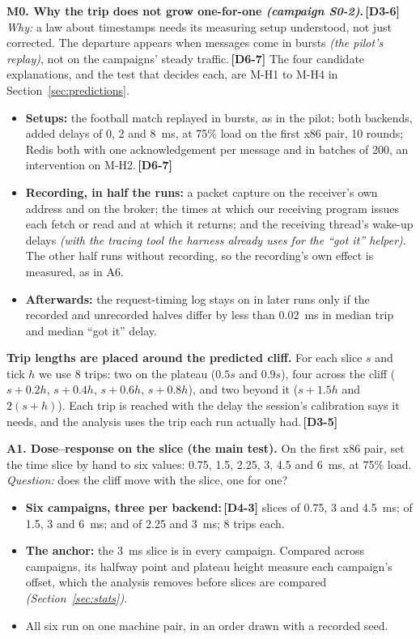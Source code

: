 \documentclass[11pt]{article}
\newcommand{\gl}[1]{{\color{soft}\itshape\small (#1)}}
\newcommand{\chg}[1]{\,{\color{chgcol}\bfseries\footnotesize[#1]}}
\newcommand{\chgold}[1]{\,{\color{oldcol}\bfseries\footnotesize[#1]}}
\begin{document}
\textbf{M0. Why the trip does not grow one-for-one \gl{campaign S0-2}.}\chgold{D3-6} \emph{Why:} a law about timestamps needs its measuring setup understood, not just corrected. The departure appears when messages come in bursts \gl{the pilot's replay}, not on the campaigns' steady traffic.\chg{D6-7} The four candidate explanations, and the test that decides each, are M-H1 to M-H4 in Section~\ref{sec:predictions}.
\begin{itemize}
  \item \textbf{Setups:} the football match replayed in bursts, as in the pilot; both backends, added delays of 0, 2 and 8~ms, at 75\% load on the first x86 pair, 10 rounds; Redis both with one acknowledgement per message and in batches of 200, an intervention on M-H2.\chg{D6-7}
  \item \textbf{Recording, in half the runs:} a packet capture on the receiver's own address and on the broker; the times at which our receiving program issues each fetch or read and at which it returns; and the receiving thread's wake-up delays \gl{with the tracing tool the harness already uses for the ``got it'' helper}. The other half runs without recording, so the recording's own effect is measured, as in A6.
  \item \textbf{Afterwards:} the request-timing log stays on in later runs only if the recorded and unrecorded halves differ by less than 0.02~ms in median trip and median ``got it'' delay.
\end{itemize}

\textbf{Trip lengths are placed around the predicted cliff.} For each slice $s$ and tick $h$ we use 8 trips: two on the plateau ($0.5s$ and $0.9s$), four across the cliff ($s + 0.2h$, $s + 0.4h$, $s + 0.6h$, $s + 0.8h$), and two beyond it ($s + 1.5h$ and $2(s + h)$). Each trip is reached with the delay the session's calibration says it needs, and the analysis uses the trip each run actually had.\chgold{D3-5}

\textbf{A1. Dose--response on the slice (the main test).} On the first x86 pair, set the time slice by hand to six values: 0.75, 1.5, 2.25, 3, 4.5 and 6~ms, at 75\% load. \emph{Question:} does the cliff move with the slice, one for one?
\begin{itemize}
  \item \textbf{Six campaigns, three per backend:}\chgold{D4-3} slices of 0.75, 3 and 4.5~ms; of 1.5, 3 and 6~ms; and of 2.25 and 3~ms; 8 trips each.
  \item \textbf{The anchor:} the 3~ms slice is in every campaign. Compared across campaigns, its halfway point and plateau height measure each campaign's offset, which the analysis removes before slices are compared \gl{Section~\ref{sec:stats}}.
  \item All six run on one machine pair, in an order drawn with a recorded seed.
\end{itemize}
\end{document}
